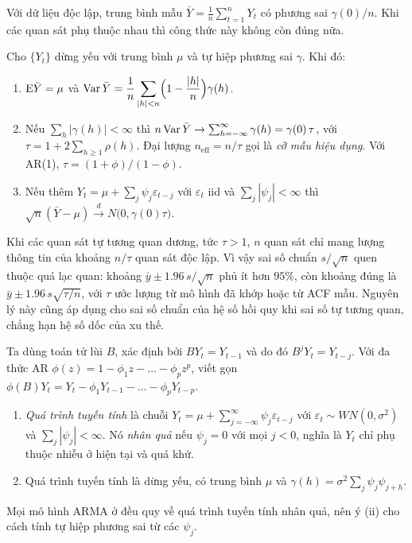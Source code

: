 Với dữ liệu độc lập, trung bình mẫu $\bar Y=\frac1n\sum_{t=1}^nY_t$ có phương sai $\gamma(0)/n$. Khi các quan sát phụ thuộc nhau thì công thức này không còn đúng nữa.
\begin{kq}
Cho $\{Y_t\}$ dừng yếu với trung bình $\mu$ và tự hiệp phương sai $\gamma$. Khi đó:
\begin{enumerate}[label=(\roman*),leftmargin=*,itemsep=1pt]
\item $\mathrm{E}\bar Y=\mu$ và $\displaystyle\operatorname{Var}\bar Y=\frac1n\sum_{|h|<n}\Bigl(1-\frac{|h|}{n}\Bigr)\gamma(h)$.
\item Nếu $\sum_h|\gamma(h)|<\infty$ thì $n\operatorname{Var}\bar Y\to\sum_{h=-\infty}^{\infty}\gamma(h)=\gamma(0)\,\tau$, với $\tau=1+2\sum_{h\ge1}\rho(h)$. Đại lượng $n_{\mathrm{eff}}=n/\tau$ gọi là \emph{cỡ mẫu hiệu dụng}. Với AR(1), $\tau=(1+\phi)/(1-\phi)$.
\item Nếu thêm $Y_t=\mu+\sum_j\psi_j\varepsilon_{t-j}$ với $\varepsilon_t$ iid và $\sum_j|\psi_j|<\infty$ thì $\sqrt n(\bar Y-\mu)\xrightarrow{d}N\bigl(0,\gamma(0)\tau\bigr)$.
\end{enumerate}
\end{kq}
Khi các quan sát tự tương quan dương, tức $\tau>1$, $n$ quan sát chỉ mang lượng thông tin của khoảng $n/\tau$ quan sát độc lập. Vì vậy sai số chuẩn $s/\sqrt n$ quen thuộc quá lạc quan: khoảng $\bar y\pm1.96\,s/\sqrt n$ phủ ít hơn $95\%$, còn khoảng đúng là $\bar y\pm1.96\,s\sqrt{\tau/n}$, với $\tau$ ước lượng từ mô hình đã khớp hoặc từ ACF mẫu. Nguyên lý này cũng áp dụng cho sai số chuẩn của hệ số hồi quy khi sai số tự tương quan, chẳng hạn hệ số dốc của xu thế.

Ta dùng toán tử lùi $B$, xác định bởi $BY_t=Y_{t-1}$ và do đó $B^jY_t=Y_{t-j}$. Với đa thức AR $\phi(z)=1-\phi_1z-\dots-\phi_pz^p$, viết gọn $\phi(B)Y_t=Y_t-\phi_1Y_{t-1}-\dots-\phi_pY_{t-p}$.
\begin{kq}
\begin{enumerate}[label=(\roman*),leftmargin=*,itemsep=1pt]
\item \emph{Quá trình tuyến tính} là chuỗi $Y_t=\mu+\sum_{j=-\infty}^{\infty}\psi_j\varepsilon_{t-j}$ với $\varepsilon_t\sim WN(0,\sigma^2)$ và $\sum_j|\psi_j|<\infty$. Nó \emph{nhân quả} nếu $\psi_j=0$ với mọi $j<0$, nghĩa là $Y_t$ chỉ phụ thuộc nhiễu ở hiện tại và quá khứ.
\item Quá trình tuyến tính là dừng yếu, có trung bình $\mu$ và $\gamma(h)=\sigma^2\sum_j\psi_j\psi_{j+h}$.
\end{enumerate}
\end{kq}
Mọi mô hình ARMA ở  đều quy về quá trình tuyến tính nhân quả, nên ý (ii) cho cách tính tự hiệp phương sai từ các $\psi_j$.

